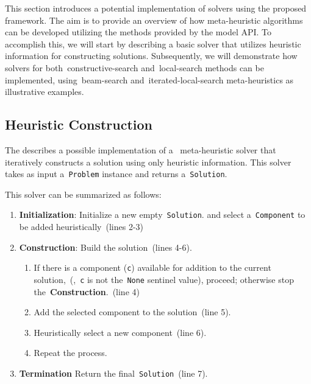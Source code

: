 This section introduces a potential implementation of solvers using the proposed
framework. The aim is to provide an overview of how meta-heuristic algorithms
can be developed utilizing the methods provided by the model API. To accomplish
this, we will start by describing a basic solver that utilizes heuristic
information for constructing solutions. Subsequently, we will demonstrate how
solvers for both~\acrshort{constructive-search} and~\acrshort{local-search}
methods can be implemented, using~\acrshort{beam-search}
and~\acrshort{iterated-local-search} meta-heuristics as illustrative examples.

\subsection{Heuristic Construction}
\label{subsec:heuristic-construction}

The  describes a possible implementation of a
~\acrshort{meta-heuristic} solver that iteratively constructs a solution using
only heuristic information. This solver takes as input a~\texttt{Problem}
instance and returns a~\texttt{Solution}.



This solver can be summarized as follows:

\begin{enumerate}
  \item \textbf{Initialization}: Initialize a new empty~\texttt{Solution}.
        and select a~\texttt{Component} to be added heuristically~(lines 2-3)
  \item \textbf{Construction}: Build the solution~(lines 4-6).
        \begin{enumerate}
          \item If there is a component (\texttt{c}) available for addition to the
                current solution,~(\ie{},~\texttt{c} is not the~\texttt{None}
                sentinel value), proceed; otherwise stop the~\textbf{Construction}.~(line 4)
          \item Add the selected component to the solution~(line 5).
          \item Heuristically select a new component~(line 6).
          \item Repeat the process.
        \end{enumerate}
  \item \textbf{Termination} Return the final~\texttt{Solution}~(line 7).
\end{enumerate}

